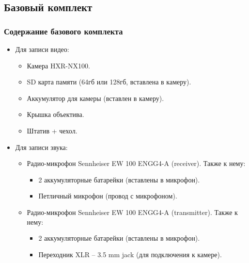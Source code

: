 \subsection{Базовый комплект}\label{ssec:basic-set}

\subsubsection{Содержание базового комплекта}

\begin{itemize}[noitemsep]
  \item Для записи видео:
        \begin{itemize}
          \item Камера \textsf{HXR-NX100}.
          \item \textsf{SD} карта памяти (64гб или 128гб, вставлена в камеру).
          \item Аккумулятор для камеры (вставлен в камеру).
          \item Крышка объектива.
          \item Штатив + чехол.
        \end{itemize}
        \vspace{5pt}

  \item Для записи звука:
        \begin{itemize}
          \item Радио-микрофон \textsf{Sennheiser EW 100 ENGG4-A (receiver)}. Также к нему:
                \begin{itemize}
                  \item 2 аккумуляторные батарейки (вставлены в микрофон).
                  \item Петличный микрофон (провод с микрофоном).
                \end{itemize}

          \item Радио-микрофон \textsf{Sennheiser EW 100 ENGG4-A (transmitter)}. Также к нему:
                \begin{itemize}
                  \item 2 аккумуляторные батарейки (вставлены в микрофон).
                  \item Переходник \textsf{XLR -- 3.5 mm jack} (для подключения к камере).
                \end{itemize}
        \end{itemize}
        \vspace{5pt}


\end{itemize}
